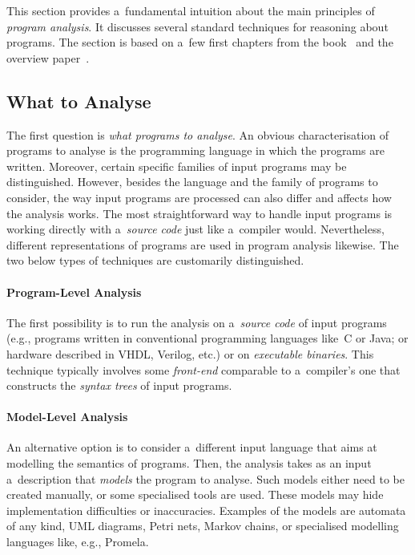 This section provides a~fundamental intuition about the main principles of \emph{program analysis}. It discusses several standard techniques for reasoning about programs. The section is based on a~few first chapters from the book~\cite{staticAnalysisRival} and the overview paper~\cite{analysisAndVerVojnarKrena}.

\subsection{What to Analyse}

The first question is \emph{what programs to analyse}. An obvious characterisation of programs to analyse is the programming language in which the programs are written. Moreover, certain specific families of input programs may be distinguished. However, besides the language and the family of programs to consider, the way input programs are processed can also differ and affects how the analysis works. The most straightforward way to handle input programs is working directly with a~\emph{source code} just like a~compiler would. Nevertheless, different representations of programs are used in program analysis likewise. The two below types of techniques are customarily distinguished.

\paragraph{Program-Level Analysis}
The first possibility is to run the analysis on a~\emph{source code} of input programs (e.g., programs written in conventional programming languages like~C or Java; or hardware described in VHDL, Verilog, etc.) or on \emph{executable binaries}. This technique typically involves some \emph{front-end} comparable to a~compiler's one that constructs the \emph{syntax trees} of input programs.

\paragraph{Model-Level Analysis}
An alternative option is to consider a~different input language that aims at modelling the semantics of programs. Then, the analysis takes as an input a~description that \emph{models} the program to analyse. Such models either need to be created manually, or some specialised tools are used. These models may hide implementation difficulties or inaccuracies. Examples of the models are automata of any kind, UML diagrams, Petri nets, Markov chains, or specialised modelling languages like, e.g., Promela.


